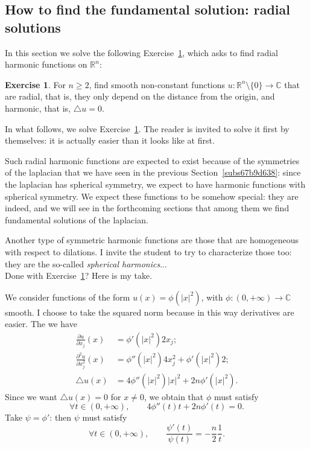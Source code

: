 \documentclass[a4paper,9pt]{amsart}
\newcommand{\R}{\mathbb{R}}	%
\newcommand{\C}{\mathbb{C}}	%
\newcommand{\de}{\partial}		%
\newcommand{\laplacian}{\triangle}
\newcommand{\abs}[1]{\left\lvert #1 \right\rvert}
\theoremstyle{plain}
\theoremstyle{definition}
\newtheorem{exercise}[proposition]{Exercise}%
\theoremstyle{remark}
\begin{document}
\subsection{How to find the fundamental solution: radial solutions}\label{subs67b9d8f3}

In this section we solve the following Exercise~\ref{ex6889d8bc}, which asks to find radial harmonic functions on $\R^n$:

\begin{exercise}\label{ex6889d8bc}
	For $n\ge2$,
	find smooth non-constant functions $u:\R^n\setminus\{0\}\to\C$ that are radial, that is, they only depend on the distance from the origin, and harmonic, that is, $\laplacian u =0 $.
\end{exercise}

In what follows, we solve Exercise~\ref{ex6889d8bc}.
The reader is invited to solve it first by themselves: it is actually easier than it looks like at first.

Such radial harmonic functions are expected to exist because of the symmetries of the laplacian that we have seen in the previous Section~\ref{subs67b9d638}:
since the laplacian has spherical symmetry, we expect to have harmonic functions with spherical symmetry.
We expect these functions to be somehow special: they are indeed, and we will see in the forthcoming sections that among them we find fundamental solutions of the laplacian.

Another type of symmetric harmonic functions are those that are homogeneous with respect to dilations.
I invite the student to try to characterize those too: they are the so-called \emph{spherical harmonics}...\\

Done with Exercise~\ref{ex6889d8bc}? Here is my take.

We consider functions of the form $u(x) = \phi(\abs{x}^2)$, with $\phi:(0,+\infty)\to\C$ smooth.
I choose to take the squared norm because in this way derivatives are easier.
The we have
\begin{align}
	\frac{\de u}{\de x_j}(x) &= \phi'(\abs{x}^2) 2 x_j ; \\
	\frac{\de^2 u}{\de x_j^2}(x) &= \phi''(\abs{x}^2) 4 x_j^2 + \phi'(\abs{x}^2) 2 ; \\
	\laplacian u (x) &= 4 \phi''(\abs{x}^2) \abs{x}^2 + 2n \phi'(\abs{x}^2) .
\end{align}
Since we want $\laplacian u (x) = 0$ for $x\neq0$, we obtain that $\phi$ must satisfy 
\begin{equation}\label{eq6889dc0f}
	\forall t\in(0,+\infty),\qquad
	4 \phi''(t) t + 2n \phi'(t) = 0 .
\end{equation}
Take $\psi = \phi'$: then $\psi$ must satisfy
\begin{equation}\label{eq6889dc59}
	\forall t\in(0,+\infty),\qquad
	\frac{\psi'(t)}{\psi(t)} = - \frac{n}{2} \frac1t .
\end{equation}
\end{document}
